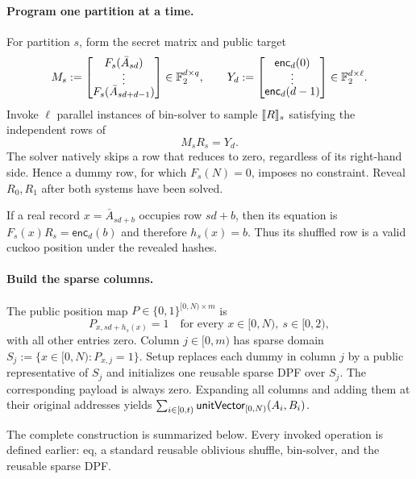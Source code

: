\paragraph{Program one partition at a time.}
For partition $s$, form the secret matrix and public target
\[
 M_s:=
 \begin{bmatrix}
  F_s(\bar A_{sd})\\[-1mm]
  \vdots\\[-1mm]
  F_s(\bar A_{sd+d-1})
 \end{bmatrix}
 \in\mathbb{F}_2^{d\times q},
 \qquad
 Y_d:=
 \begin{bmatrix}
  \mathsf{enc}_d(0)\\[-1mm]
  \vdots\\[-1mm]
  \mathsf{enc}_d(d-1)
 \end{bmatrix}
 \in\mathbb{F}_2^{d\times\ell}.
\]
Invoke $\ell$ parallel instances of \textsf{bin-solver} to sample
$\share R_s$ satisfying the independent rows of
\begin{equation}\label{eq:rc-programming-system}
 M_sR_s=Y_d.
\end{equation}
The solver natively skips a row that reduces to zero, regardless of its
right-hand side.  Hence a dummy row, for which $F_s(N)=0$, imposes no
constraint.  Reveal $R_0,R_1$ after both systems have been solved.

If a real record $x=\bar A_{sd+b}$ occupies row $sd+b$, then its equation is
$F_s(x)R_s=\mathsf{enc}_d(b)$ and therefore $h_s(x)=b$.  Thus its shuffled row is a
valid cuckoo position under the revealed hashes.

\paragraph{Build the sparse columns.}
The public position map $P\in\{0,1\}^{[0,N)\times m}$ is
\begin{equation}\label{eq:rc-position-map}
 P_{x,sd+h_s(x)}=1
 \quad\text{for every }x\in[0,N),\ s\in[0,2),
\end{equation}
with all other entries zero.  Column $j\in[0,m)$ has sparse domain
$S_j:=\{x\in[0,N):P_{x,j}=1\}$.  Setup replaces each dummy in column $j$ by a
public representative of $S_j$ and initializes one reusable sparse DPF over
$S_j$.  The corresponding payload is always zero.  Expanding all columns and
adding them at their original addresses yields
$\sum_{i\in[0,t)}\mathsf{unitVector}_{[0,N)}(A_i,B_i)$.

The complete construction is summarized below.  Every invoked operation is
defined earlier: \textsf{eq}, a standard reusable oblivious shuffle,
\textsf{bin-solver}, and the reusable sparse DPF.

